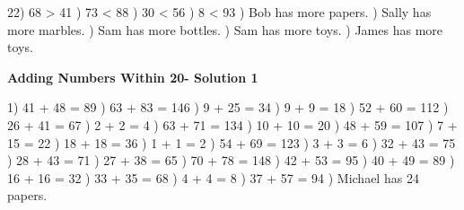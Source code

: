 \documentclass{article}%
\begin{document}
22) 68 > 41%
) 73 < 88%
) 30 < 56%
) 8 < 93%
) Bob has more papers.%
) Sally has more marbles.%
) Sam has more bottles.%
) Sam has more toys.%
) James has more toys.%
\newline%
\newpage%
\large%
\begin{center}%
\textbf{Adding Numbers Within 20- Solution 1}%
\newline%
\end{center} \normalsize%
1) 41 + 48 = 89%
) 63 + 83 = 146%
) 9 + 25 = 34%
) 9 + 9 = 18%
) 52 + 60 = 112%
) 26 + 41 = 67%
) 2 + 2 = 4%
) 63 + 71 = 134%
) 10 + 10 = 20%
) 48 + 59 = 107%
) 7 + 15 = 22%
) 18 + 18 = 36%
) 1 + 1 = 2%
) 54 + 69 = 123%
) 3 + 3 = 6%
) 32 + 43 = 75%
) 28 + 43 = 71%
) 27 + 38 = 65%
) 70 + 78 = 148%
) 42 + 53 = 95%
) 40 + 49 = 89%
) 16 + 16 = 32%
) 33 + 35 = 68%
) 4 + 4 = 8%
) 37 + 57 = 94%
) Michael has 24 papers.%
\newline%
\end{document}
